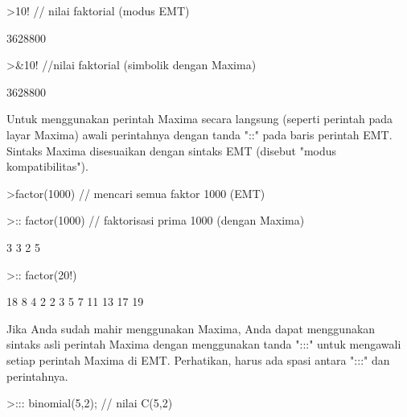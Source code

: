 \documentclass{article}
\begin{document}
\begin{eulernotebook}
\begin{eulercomment}
\begin{eulercomment}
\begin{eulercomment}
\begin{eulercomment}
\begin{eulercomment}
\begin{eulercomment}
\begin{euleroutput}
\end{euleroutput}
\begin{eulerprompt}
>10! // nilai faktorial (modus EMT)
\end{eulerprompt}
\begin{euleroutput}
  3628800
\end{euleroutput}
\begin{eulerprompt}
>&10! //nilai faktorial (simbolik dengan Maxima)
\end{eulerprompt}
\begin{euleroutput}
  
                                       3628800
  
\end{euleroutput}
\begin{eulercomment}
Untuk menggunakan perintah Maxima secara langsung (seperti perintah pada layar
Maxima) awali perintahnya dengan tanda "::" pada baris perintah EMT. Sintaks
Maxima disesuaikan dengan sintaks EMT (disebut "modus kompatibilitas").
\end{eulercomment}
\begin{eulerprompt}
>factor(1000) // mencari semua faktor 1000 (EMT)
\end{eulerprompt}
\begin{euleroutput}
  [2,  2,  2,  5,  5,  5]
\end{euleroutput}
\begin{eulerprompt}
>:: factor(1000) // faktorisasi prima 1000 (dengan Maxima) 
\end{eulerprompt}
\begin{euleroutput}
  
                                         3  3
                                        2  5
  
\end{euleroutput}
\begin{eulerprompt}
>:: factor(20!)
\end{eulerprompt}
\begin{euleroutput}
  
                               18  8  4  2
                              2   3  5  7  11 13 17 19
  
\end{euleroutput}
\begin{eulercomment}
Jika Anda sudah mahir menggunakan Maxima, Anda dapat menggunakan sintaks asli
perintah Maxima dengan menggunakan tanda ":::" untuk mengawali setiap perintah
Maxima di EMT. Perhatikan, harus ada spasi antara ":::" dan perintahnya.
\end{eulercomment}
\begin{eulerprompt}
>::: binomial(5,2); // nilai C(5,2)
\end{eulerprompt}
\begin{euleroutput}
  

\end{euleroutput}
\end{eulercomment}
\end{eulercomment}
\end{eulercomment}
\end{eulercomment}
\end{eulercomment}
\end{eulercomment}
\end{eulernotebook}
\end{document}
